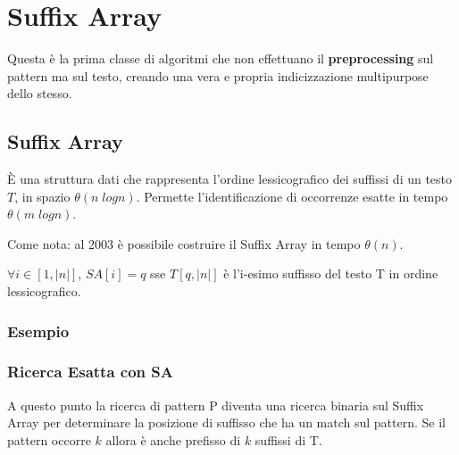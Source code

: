 \chapter{Suffix Array}

Questa \`e la prima classe di algoritmi che non effettuano il \textbf{preprocessing} sul pattern ma sul testo, creando una vera e propria indicizzazione multipurpose dello stesso.

\section{Suffix Array}

\`E una struttura dati che rappresenta l'ordine lessicografico dei suffissi di un testo $T$, in spazio $\theta(n\;logn)$. Permette l'identificazione di occorrenze esatte in tempo $\theta(m\;logn)$.

Come nota: al 2003 \`e possibile costruire il Suffix Array in tempo $\theta(n)$.

$\forall i \in [1, |n|]$, $SA[i] = q$ sse $T[q,|n|]$ \`e l'i-esimo suffisso del testo T in ordine lessicografico.

\subsection{Esempio}


\subsection{Ricerca Esatta con SA}

A questo punto la ricerca di pattern P diventa una ricerca binaria sul Suffix Array per determinare la posizione di suffisso che ha un match sul pattern. Se il pattern occorre $k$ allora \`e anche prefisso di $k$ suffissi di T.


